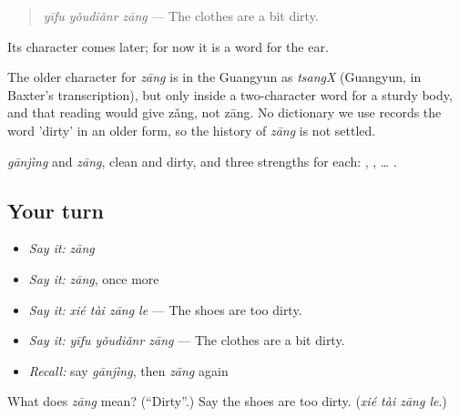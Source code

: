 \begin{quote}
\emph{yīfu yǒudiǎnr zāng} — The clothes are a bit dirty.
\end{quote}

Its character comes later; for now it is a word for the ear.

\begin{cousinweb}
The older character for \emph{zāng} is in the Guangyun as \emph{tsangX} (Guangyun, in Baxter's transcription), but only inside a two-character word for a sturdy body, and that reading would give zǎng, not zāng. No dictionary we use records the word 'dirty' in an older form, so the history of \emph{zāng} is not settled.
\end{cousinweb}

\begin{grammarlens}[title={What you've built}]
\emph{gānjìng} and \emph{zāng}, clean and dirty, and three strengths for each: , ,  … .
\end{grammarlens}

\subsection*{Your turn}
\begin{itemize}
\raggedright
  \item \emph{Say it:} \emph{zāng}
  \item \emph{Say it:} \emph{zāng}, once more
  \item \emph{Say it:} \emph{xié tài zāng le} — The shoes are too dirty.
  \item \emph{Say it:} \emph{yīfu yǒudiǎnr zāng} — The clothes are a bit dirty.
  \item \emph{Recall:} say \emph{gānjìng}, then \emph{zāng} again
\end{itemize}

\begin{tcolorbox}[breakable,colback=teal!4,colframe=teal!35!black,title={Before you move on}]
What does \emph{zāng} mean? (\textquotedblleft{}Dirty\textquotedblright{}.) Say the shoes are too dirty. (\emph{xié tài zāng le}.)
\end{tcolorbox}
\section[Practice]{}

\label{lesson:ZH-C93-practice}



